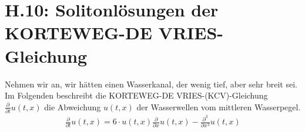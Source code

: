 \documentclass[ngerman]{scrartcl}
\begin{document}
\thispagestyle{fancy}
\section*{H.10: Solitonlösungen der KORTEWEG-DE VRIES-Gleichung}
Nehmen wir an, wir hätten einen Wasserkanal, der wenig tief, aber sehr breit sei. Im Folgenden beschreibt die KORTEWEG-DE VRIES-(KCV)-Gleichung $\frac{\partial}{\partial t}u(t,x)$ die Abweichung $u(t,x)$ der Wasserwellen vom mittleren Wasserpegel. 
\begin{align}
\frac{\partial}{\partial t}u(t,x) = 6 \cdot u(t,x) \frac{\partial}{\partial x}u(t,x) - \frac{\partial^3}{\partial x^3} u(t,x)
\end{align}
\end{document}
